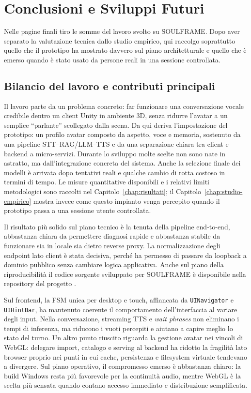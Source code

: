 \chapter{Conclusioni e Sviluppi Futuri}
\label{chap:conclusioni}

Nelle pagine finali tiro le somme del lavoro svolto su SOULFRAME. Dopo aver separato la valutazione tecnica dallo studio empirico, qui raccolgo soprattutto quello che il prototipo ha mostrato davvero sul piano architetturale e quello che è emerso quando è stato usato da persone reali in una sessione controllata.

\section{Bilancio del lavoro e contributi principali}
\label{sec:sintesi}
\label{sec:contributi-raggiunti}

Il lavoro parte da un problema concreto: far funzionare una conversazione vocale credibile dentro un client Unity in ambiente 3D, senza ridurre l'avatar a un semplice ``parlante'' scollegato dalla scena. Da qui deriva l'impostazione del prototipo: un profilo avatar composto da aspetto, voce e memoria, sostenuto da una pipeline STT--RAG/LLM--TTS e da una separazione chiara tra client e backend a micro-servizi. Durante lo sviluppo molte scelte non sono nate in astratto, ma dall'integrazione concreta del sistema. Anche la selezione finale dei modelli è arrivata dopo tentativi reali e qualche cambio di rotta costoso in termini di tempo. Le misure quantitative disponibili e i relativi limiti metodologici sono raccolti nel Capitolo~\ref{chap:risultati}; il Capitolo~\ref{chap:studio-empirico} mostra invece come questo impianto venga percepito quando il prototipo passa a una sessione utente controllata.

Il risultato più solido sul piano tecnico è la tenuta della pipeline end-to-end, abbastanza chiara da permettere diagnosi rapide e abbastanza stabile da funzionare sia in locale sia dietro reverse proxy. La normalizzazione degli endpoint lato client è stata decisiva, perché ha permesso di passare da loopback a dominio pubblico senza cambiare logica applicativa. Anche sul piano della riproducibilità il codice sorgente sviluppato per SOULFRAME è disponibile nella repository del progetto \cite{SOULFRAMERepo}.

Sul frontend, la FSM unica per desktop e touch, affiancata da \texttt{UINavigator} e \texttt{UIHintBar}, ha mantenuto coerente il comportamento dell'interfaccia al variare degli input. Nella conversazione, streaming TTS e \emph{wait phrases} non eliminano i tempi di inferenza, ma riducono i vuoti percepiti e aiutano a capire meglio lo stato del turno. Un altro punto riuscito riguarda la gestione avatar nei vincoli di WebGL: delegare import, catalogo e serving al backend ha ridotto la fragilità lato browser proprio nei punti in cui cache, persistenza e filesystem virtuale tendevano a divergere. Sul piano operativo, il compromesso emerso è abbastanza chiaro: la build Windows resta più favorevole per la continuità audio, mentre WebGL è la scelta più sensata quando contano accesso immediato e distribuzione semplificata.

